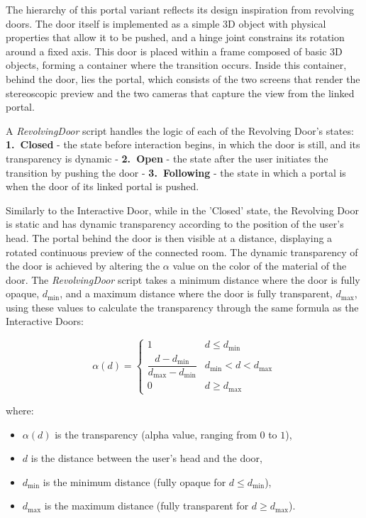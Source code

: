 The hierarchy of this portal variant reflects its design inspiration from revolving doors. 
The door itself is implemented as a simple 3D object with physical properties that allow it to be pushed, and a hinge joint constrains its rotation around a fixed axis. 
This door is placed within a frame composed of basic 3D objects, forming a container where the transition occurs. 
Inside this container, behind the door, lies the portal, which consists of the two screens that render the stereoscopic preview 
and the two cameras that capture the view from the linked portal.

A \textit{RevolvingDoor} script handles the logic of each of the Revolving Door's states: 
\textbf{1.~Closed} - the state before interaction begins, in which the door is still, and its transparency is dynamic - 
\textbf{2.~Open} - the state after the user initiates the transition by pushing the door - 
\textbf{3.~Following} - the state in which a portal is when the door of its linked portal is pushed.

Similarly to the Interactive Door, while in the 'Closed' state, the Revolving Door is static and has dynamic transparency according to the position 
of the user's head. The portal behind the door is then visible at a distance, displaying a rotated continuous preview of the connected room.
The dynamic transparency of the door is achieved by altering the $\alpha$ value on the color of the material of the door. The \textit{RevolvingDoor}
script takes a minimum distance where the door is fully opaque, $d_{\min}$, and a maximum distance where the door is fully transparent, $d_{\max}$,
using these values to calculate the transparency through the same formula as the Interactive Doors:

\[
\alpha(d) =
\begin{cases}
1 & d \le d_{\min} \\[6pt]
\dfrac{d - d_{\min}}{d_{\max} - d_{\min}} & d_{\min} < d < d_{\max} \\[10pt]
0 & d \ge d_{\max}
\end{cases}
\]

where:
\begin{itemize}
  \item $\alpha(d)$ is the transparency (alpha value, ranging from $0$ to $1$),
  \item $d$ is the distance between the user's head and the door,
  \item $d_{\min}$ is the minimum distance (fully opaque for $d \le d_{\min}$),
  \item $d_{\max}$ is the maximum distance (fully transparent for $d \ge d_{\max}$).
\end{itemize}

